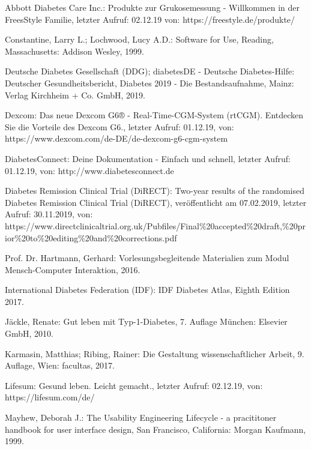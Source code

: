 \documentclass[a4paper,11pt]{article}%
\renewcommand{\\}{\vspace*{0.5\baselineskip} \newline}
\begin{document}
\begin{thebibliography}{1}
	
	Abbott Diabetes Care Inc.:
	Produkte zur Grukosemessung - Willkommen in der FreesStyle Familie, letzter Aufruf: 02.12.19 von:
	https://freestyle.de/produkte/	
	
	Constantine, Larry L.; Lochwood, Lucy A.D.: 
	Software for Use, 
	Reading, Massachusetts: Addison Wesley,
	1999.
	
	Deutsche Diabetes Gesellschaft (DDG); diabetesDE - Deutsche Diabetes-Hilfe:
	Deutscher Gesundheitsbericht, Diabetes 2019 - Die Bestandsaufnahme, 
	Mainz: Verlag Kirchheim + Co. GmbH,
	2019.
	
	Dexcom:
	Das neue Dexcom G6® - Real-Time-CGM-System (rtCGM). Entdecken Sie die Vorteile des Dexcom G6., letzter Aufruf: 01.12.19, von: https://www.dexcom.com/de-DE/de-dexcom-g6-cgm-system
	
	DiabetesConnect:
	Deine Dokumentation - Einfach und schnell, letzter Aufruf: 01.12.19, von: http://www.diabetesconnect.de
	
	Diabetes Remission Clinical Trial (DiRECT):
	Two-year results of the randomised Diabetes Remission Clinical Trial (DiRECT), veröffentlicht am 07.02.2019, \newline
	letzter Aufruf: 30.11.2019, von: https://www.directclinicaltrial.org.uk/Pubfiles/Final\newline\%20accepted\%20draft,\%20prior\%20to\%20editing\%20and\%20corrections.pdf
	
	Prof. Dr. Hartmann, Gerhard: 
	Vorlesungsbegleitende Materialien zum Modul Mensch-Computer Interaktion, 
	2016.
	
	International Diabetes Federation (IDF): 
	IDF Diabetes Atlas, Eighth Edition 2017.
	
	Jäckle, Renate: 
	Gut leben mit Typ-1-Diabetes, 7. Auflage
	München: Elsevier GmbH,
	2010.
	
	Karmasin, Matthias; Ribing, Rainer: 
	Die Gestaltung wissenschaftlicher Arbeit, 9. Auflage,
	Wien: facultas,
	2017.
	
	Lifesum: Gesund leben. Leicht gemacht., letzter Aufruf: 02.12.19, von: \newline https://lifesum.com/de/
	
	
	Mayhew, Deborah J.: 
	The Usability Engineering Lifecycle - a pracititoner handbook for user interface design,
	San Francisco, California: Morgan Kaufmann,
	1999.
	

\end{thebibliography}
\end{document}
